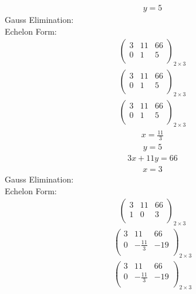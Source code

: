 \documentclass{article}
\begin{document}
\begin{align*}
y=5\end{align*}
Gauss Elimination:\\
Echelon Form:\\
\begin{align*}
\left(
\begin{array}{cc|c}
3 & 11 & 66\\
0 & 1 & 5\\
\end{array}
\right)_{2\times 3}
\end{align*}
\begin{align*}
\left(
\begin{array}{cc|c}
3 & 11 & 66\\
0 & 1 & 5\\
\end{array}
\right)_{2\times 3}
\end{align*}
\begin{align*}
\left(
\begin{array}{cc|c}
3 & 11 & 66\\
0 & 1 & 5\\
\end{array}
\right)_{2\times 3}
\end{align*}
\begin{align*}
x=\frac{11}{3}\end{align*}
\begin{align*}
y=5\end{align*}
\begin{align*}
3x + 11y=66\end{align*}
\begin{align*}
x=3\end{align*}
Gauss Elimination:\\
Echelon Form:\\
\begin{align*}
\left(
\begin{array}{cc|c}
3 & 11 & 66\\
1 & 0 & 3\\
\end{array}
\right)_{2\times 3}
\end{align*}
\begin{align*}
\left(
\begin{array}{cc|c}
3 & 11 & 66\\
0 & -\frac{11}{3} & -19\\
\end{array}
\right)_{2\times 3}
\end{align*}
\begin{align*}
\left(
\begin{array}{cc|c}
3 & 11 & 66\\
0 & -\frac{11}{3} & -19\\
\end{array}
\right)_{2\times 3}
\end{align*}
\end{document}
